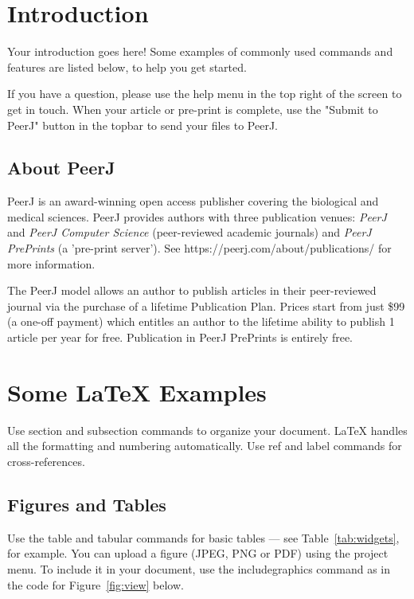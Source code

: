 \documentclass[fleqn,10pt]{wlpeerj} %
\begin{document}
\iffalse

\newpage{}
\section*{Introduction}

Your introduction goes here! Some examples of commonly used commands and features are listed below, to help you get started.

If you have a question, please use the help menu in the top right of the screen to get in touch. When your article or pre-print is complete, use the "Submit to PeerJ" button in the topbar to send your files to PeerJ.

\subsection*{About PeerJ}

PeerJ is an award-winning open access publisher covering the biological and medical sciences.  PeerJ provides authors with three publication venues: \textit{PeerJ} and \textit{PeerJ Computer Science} (peer-reviewed academic journals) and \textit{PeerJ PrePrints} (a 'pre-print server'). See https://peerj.com/about/publications/ for more information.

The PeerJ model allows an author to publish articles in their peer-reviewed journal via the purchase of a lifetime Publication Plan. Prices start from just \$99 (a one-off payment) which entitles an author to the lifetime ability to publish 1 article per year for free. Publication in PeerJ PrePrints is entirely free.

\section*{Some \LaTeX{} Examples}
\label{sec:examples}

Use section and subsection commands to organize your document. \LaTeX{} handles all the formatting and numbering automatically. Use ref and label commands for cross-references.

\subsection*{Figures and Tables}

Use the table and tabular commands for basic tables --- see Table~\ref{tab:widgets}, for example. You can upload a figure (JPEG, PNG or PDF) using the project menu. To include it in your document, use the includegraphics command as in the code for Figure~\ref{fig:view} below.
\end{document}
